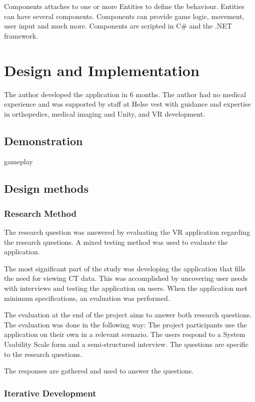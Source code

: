 \documentclass[a4paper]{report}
\begin{document}
Components attaches to one or more Entities to define the behaviour. Entities can have several components. Components can provide game logic, movement, user input and much more. Components are scripted in C\# and the .NET framework.

\chapter{Design and Implementation}\label{Design and Implementation}
The author developed the application in 6 months. The author had no medical experience and was supported by staff at Helse vest with guidance and expertise in orthopedics, medical imaging and Unity, and VR development.

\section{Demonstration}\label{demonstration}
gameplay

\section{Design methods}

\subsection{Research Method}
The research question was answered by evaluating the VR application regarding the research questions. A mixed testing method was used to evaluate the application.

The most significant part of the study was developing the application that fills the need for viewing CT data. This was accomplished by uncovering user needs with interviews and testing the application on users. When the application met minimum specifications, an evaluation was performed.

The evaluation at the end of the project aims to answer both research questions. The evaluation was done in the following way:
The project participants use the application on their own in a relevant scenario.
The users respond to a System Usability Scale form and a semi-structured interview. The questions are specific to the research questions.

The responses are gathered and used to answer the questions.

\subsection{Iterative Development}
\end{document}
